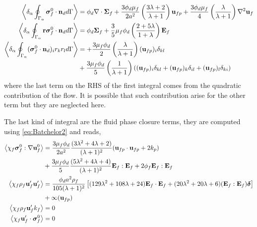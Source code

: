 \begin{align}
    \left<\delta_\alpha \oint_{\Gamma_{\alpha}} \bm{\sigma}_f^0\cdot \textbf{n}_d d\Gamma\right> &= 
    \phi_d \mathbf{\nabla}\cdot\bm\Sigma_f
    + \frac{3\phi_d\mu_f}{2 a^2} 
    \left(\frac{3\lambda+2}{\lambda+1}\right) \textbf{u}_{f p} 
    + \frac{3\phi_d\mu_f}{4} \left(\frac{\lambda}{\lambda+1}\right)\mathbf{\nabla}^2\textbf{u}_f\\
    \left<\delta_\alpha \oint_{\Gamma_{\alpha}} \textbf{r}\bm{\sigma}_f^0 \cdot \textbf{n}_d d\Gamma\right> 
    &= 
    \phi_d \bm\Sigma_f + 
    \frac{3}{5}\mu_f \phi_d \left(\frac{2+5\lambda}{1+\lambda}\right)
    \textbf{E}_f
    \\
        \left<\delta_\alpha \oint_{\Gamma_{\alpha}} (\bm{\sigma}_f^0 \cdot \textbf{n}_d)_ir_kr_l d\Gamma\right> &=
        + \frac{3\mu_f\phi_d}{2}\left(\frac{\lambda}{\lambda+1}\right)(\textbf{u}_{fp})_i\delta_{kl}\\
        &+ \frac{3\mu_f\phi_d}{5}\left(\frac{1}{\lambda+1}\right)((\textbf{u}_{fp})_i\delta_{kl}+ (\textbf{u}_{fp})_k\delta_{il}+(\textbf{u}_{fp})_l\delta_{ki})\nonumber
\end{align}
where the last term on the RHS of the first integral comes from the quadratic contribution of the flow. 
It is possible that such contribution arise for the other term but they are neglected here. 


The last kind of integral are the fluid phase closure terms, they are computed using \ref{eq:Batchelor2} and reads, 
\begin{align*}
    \left<\chi_f \bm\sigma_f^0 :\mathbf{\nabla}\textbf{u}_f^0\right>
    &=
    \frac{3\mu_f \phi_d}{2a^2}
    \frac{(3\lambda^2 + 4\lambda +2)}{(\lambda + 1)^2}
    (\textbf{u}_{fp}\cdot \textbf{u}_{fp} + 2 k_p ) \\
    &+ 
    \frac{3\mu_f \phi_d}{5}
    \frac{(5\lambda^2 + 4\lambda +4)}{(\lambda + 1)^2}
    \textbf{E}_f:\textbf{E}_f
    +2 \phi_f \textbf{E}_f:\textbf{E}_f \\
    \left<\chi_f \rho_f \textbf{u}_f' \textbf{u}_f'\right>
    &=
    \frac{\phi_d a^2 \rho_f}{105 (\lambda +1)^2 }\left[
        (129\lambda^2+108\lambda+24)\textbf{E}_f\cdot \textbf{E}_f
        + (20\lambda^2 +20\lambda + 6)
        (\textbf{E}_f : \textbf{E}_f)\bm\delta
    \right]\\
    &+\infty(\textbf{u}_{fp})\\
     \left<\chi_f\rho_f \textbf{u}_f' k_f\right> &=  0\\
    \left<\chi_f \textbf{u}_f' \cdot \bm{\sigma}_f^0\right> &=  0
\end{align*}

